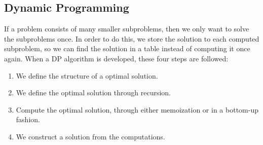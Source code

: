 \iffalse
\begin{itemize}
    \item Dynamic Programming
    \begin{itemize}
        \item Divide the problem into subproblem
        \item Solve the subproblems only once and save the solution
        \item Top-down memoization: recursion
        \item Bottom-up: 2 nestede \texttt{for}-loops
    \end{itemize}
    \item Longest common subsequence
    \begin{itemize}
        \item Finds a string that both the initial strings have in common
        \item Demonstration by figure
        \item Runtime $\Theta(mn)$
        \item Correctness - Optimal substructure
    \end{itemize}
    \item Perspective - Greedy algorithms
    \begin{itemize}
        \item Optimises in a different way
    \end{itemize}
\end{itemize}
\fi
\subsection*{Dynamic Programming}
If a problem consists of many smaller subproblems, then we only want to solve
the subproblems once. In order to do this, we store the solution to each
computed subproblem, so we can find the solution in a table instead of computing
it once again.\newline\newline
When a DP algorithm is developed, these four steps are followed:
\begin{enumerate}
  \item We define the structure of a optimal solution.
  \item We define the optimal solution through recursion.
  \item Compute the optimal solution, through either memoization or in a
  bottom-up fashion.
  \item We construct a solution from the computations.
\end{enumerate}

